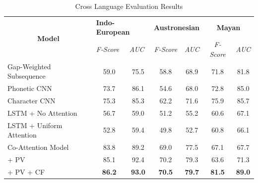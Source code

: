\documentclass[11pt,letterpaper]{article}
\begin{document}
\begin{table}[t]
\centering

\begin{tabular}{lcccccc}
\multicolumn{1}{c}{\multirow{2}{*}{\textbf{Model}}} & \multicolumn{2}{l}{\textbf{Indo-European}}                              & \multicolumn{2}{c}{\textbf{Austronesian}} & \multicolumn{2}{c}{\textbf{Mayan}} \\ \cline{2-7} 
\multicolumn{1}{c}{}                                & \multicolumn{1}{l}{\textit{F-Score}} & \multicolumn{1}{l}{\textit{AUC}} & \textit{F-Score}      & \textit{AUC}      & \textit{F-Score}  & \textit{AUC}   \\ \hline 
Gap-Weighted Subsequence                            & 59.0                                 & 75.5                             & 58.8                  & 68.9              & 71.8              & 81.8           \\
Phonetic CNN                                        & 73.7                                 & 86.1                             & 54.6                  & 68.0              & 72.8              & 85.0           \\
Character CNN                                       & 75.3                                 & 85.3                             & 62.2                  & 71.6              & 75.9              & 85.7           \\
LSTM + No Attention                                 & 56.7                                 & 59.0                             & 51.2                  & 55.2              & 60.6              & 67.1           \\
LSTM + Uniform Attention                            & 52.8                                 & 59.4                             & 49.8                  & 52.7              & 60.8              & 66.1           \\ \hline
Co-Attention Model                                  & 83.8                                 & 89.2                             & 69.0                  & 77.5              & 67.1              & 67.7           \\
\quad + PV                                                & 85.1                                 & 92.4                             & 70.2                  & 79.3              & 63.6              & 71.3           \\
\quad + PV + CF                                           & \textbf{86.2}                        & \textbf{93.0}                    & \textbf{70.5}         & \textbf{79.7}     & \textbf{81.5}              & \textbf{89.0}
\end{tabular}

\label{CL_res}
\caption{Cross Language Evaluation Results }
\end{table}
\end{document}
